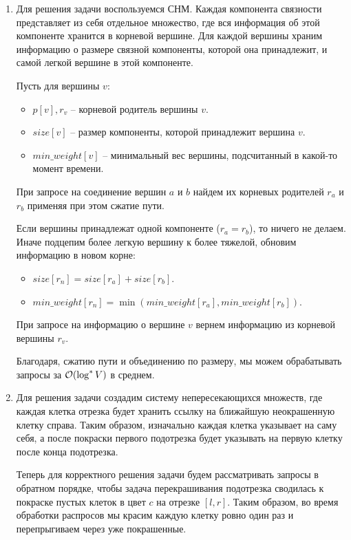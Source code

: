 \begin{enumerate}

\item

    Для решения задачи воспользуемся СНМ.
    Каждая компонента связности представляет из себя отдельное множество, где вся информация об этой компоненте хранится в корневой вершине.
    Для каждой вершины храним информацию о размере связной компоненты, которой она принадлежит, и самой легкой вершине в этой компоненте.

    Пусть для вершины $v$:
    \begin{itemize}
        \item $p[v], r_v$ -- корневой родитель вершины $v$.
        \item $size[v]$ -- размер компоненты, которой принадлежит вершина $v$.
        \item $min\_weight[v]$ -- минимальный вес вершины, подсчитанный в какой-то момент времени.
    \end{itemize}

    При запросе на соединение вершин $a$ и $b$ найдем их корневых родителей $r_a$ и $r_b$ применяя при этом сжатие пути.

    Если вершины принадлежат одной компоненте ($r_a = r_b$), то ничего не делаем.
    Иначе подцепим более легкую вершину к более тяжелой, обновим информацию в новом корне:
    \begin{itemize}
        \item $size[r_n] = size[r_a] + size[r_b]$.
        \item $min\_weight[r_n] = \min(min\_weight[r_a], min\_weight[r_b])$.
    \end{itemize}

    При запросе на информацию о вершине $v$ вернем информацию из корневой вершины $r_v$.

    Благодаря, сжатию пути и объединению по размеру, мы можем обрабатывать запросы за $\mathcal{O}(\log^* V)$ в среднем.

\item

    Для решения задачи создадим систему непересекающихся множеств, где каждая клетка отрезка будет хранить ссылку на
    ближайшую неокрашенную клетку справа. Таким образом, изначально каждая клетка указывает на саму себя, а после
    покраски первого подотрезка будет указывать на первую клетку после конца подотрезка.

    Теперь для корректного решения задачи будем рассматривать запросы в обратном порядке, чтобы
    задача перекрашивания подотрезка сводилась к покраске пустых клеток в цвет $c$ на отрезке $[l, r]$.
    Таким образом, во время обработки распросов мы красим каждую клетку ровно один раз и перепрыгиваем через уже покрашенные.
    

\end{enumerate}
